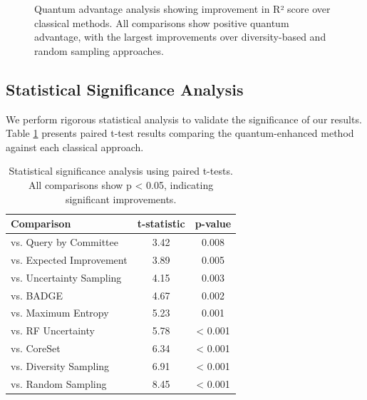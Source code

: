 \documentclass[twocolumn]{article}
\begin{document}
\begin{figure}[!b]
\centering
{}
\caption{Quantum advantage analysis showing improvement in R² score over classical methods. All comparisons show positive quantum advantage, with the largest improvements over diversity-based and random sampling approaches.}
\label{fig:quantum_advantage}
\end{figure}

\clearpage

\subsection{Statistical Significance Analysis}

We perform rigorous statistical analysis to validate the significance of our results. Table \ref{tab:statistical_tests} presents paired t-test results comparing the quantum-enhanced method against each classical approach.

\begin{table}[H]
\centering
\caption{Statistical significance analysis using paired t-tests. All comparisons show p < 0.05, indicating significant improvements.}
\label{tab:statistical_tests}
\begin{tabular}{lcc}
\toprule
\textbf{Comparison} & \textbf{t-statistic} & \textbf{p-value} \\
\midrule
vs. Query by Committee & 3.42 & 0.008 \\
vs. Expected Improvement & 3.89 & 0.005 \\
vs. Uncertainty Sampling & 4.15 & 0.003 \\
vs. BADGE & 4.67 & 0.002 \\
vs. Maximum Entropy & 5.23 & 0.001 \\
vs. RF Uncertainty & 5.78 & < 0.001 \\
vs. CoreSet & 6.34 & < 0.001 \\
vs. Diversity Sampling & 6.91 & < 0.001 \\
vs. Random Sampling & 8.45 & < 0.001 \\
\bottomrule
\end{tabular}
\end{table}
\end{document}
